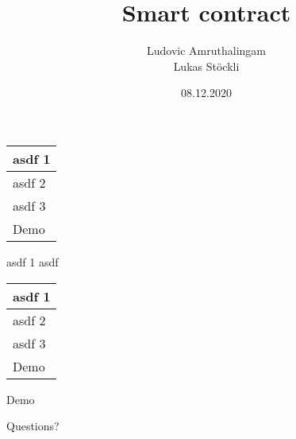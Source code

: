 \documentclass{beamer}
\title              {Smart contract}
\author             {Ludovic Amruthalingam\\Lukas Stöckli}
\institute          {University of Basel}
\date               {08.12.2020}
\begin{document}
\begin{frame}[t,plain]
	\titlepage
\end{frame}




\begin{frame}
	\begin{tabularx}{\textwidth}{X}
		\hline
		\rowcolor{hcolor}
		asdf 1\\
		\hline
		asdf 2\\
		\hline
		asdf 3\\
		\hline
		Demo\\
		\hline
	\end{tabularx}
\end{frame}




\begin{frame}{asdf 1}
asdf
\end{frame}



\begin{frame}
	\begin{tabularx}{\textwidth}{X}
		\hline
		asdf 1\\
		\hline
		\rowcolor{hcolor}
		asdf 2\\
		\hline
		asdf 3\\
		\hline
		Demo\\
		\hline
	\end{tabularx}
\end{frame}



\begin{frame}
	\begin{center}
		\huge{Demo}
	\end{center}
\end{frame}



\begin{frame}
	\begin{center}
		\huge{Questions?}
	\end{center}
\end{frame}
\end{document}
